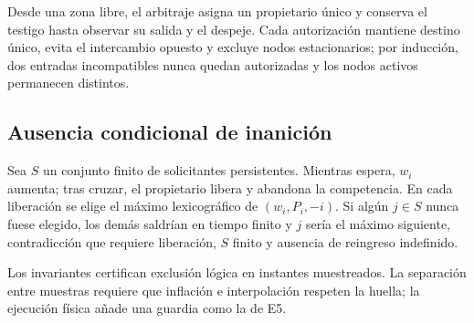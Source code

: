 Desde una zona libre, el arbitraje asigna un propietario único y conserva el testigo hasta observar su salida y el despeje. Cada autorización mantiene destino único, evita el intercambio opuesto y excluye nodos estacionarios; por inducción, dos entradas incompatibles nunca quedan autorizadas y los nodos activos permanecen distintos.

\subsection{Ausencia condicional de inanición}
\label{app:sp7-no-starvation}

Sea $S$ un conjunto finito de solicitantes persistentes. Mientras espera, $w_i$ aumenta; tras cruzar, el propietario libera y abandona la competencia. En cada liberación se elige el máximo lexicográfico de $(w_i,P_i,-i)$. Si algún \(j\in S\) nunca fuese elegido, los demás saldrían en tiempo finito y $j$ sería el máximo siguiente, contradicción que requiere liberación, $S$ finito y ausencia de reingreso indefinido.

Los invariantes certifican exclusión lógica en instantes muestreados. La separación entre muestras requiere que inflación e interpolación respeten la huella; la ejecución física añade una guardia como la de E5.
